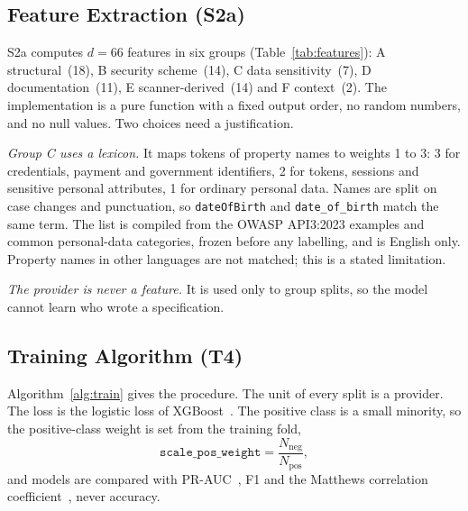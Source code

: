 \documentclass[conference]{IEEEtran}
\begin{document}
\subsection{Feature Extraction (S2a)}
\label{sec:m-feat}
S2a computes $d=66$ features in six groups (Table~\ref{tab:features}): A structural~(18),
B security scheme~(14), C data sensitivity~(7), D documentation~(11), E scanner-derived~(14)
and F context~(2). The implementation is a pure function with a fixed output order, no random
numbers, and no null values. Two choices need a justification.

\emph{Group C uses a lexicon.} It maps tokens of property names to weights 1 to 3: 3 for
credentials, payment and government identifiers, 2 for tokens, sessions and sensitive personal
attributes, 1 for ordinary personal data. Names are split on case changes and punctuation, so
\texttt{dateOfBirth} and \texttt{date\_of\_birth} match the same term. The list is compiled
from the OWASP API3:2023 examples and common personal-data categories, frozen before any
labelling, and is English only. Property names in other languages are not matched; this is a
stated limitation.

\emph{The provider is never a feature.} It is used only to group splits, so the model cannot
learn who wrote a specification.

\subsection{Training Algorithm (T4)}
Algorithm~\ref{alg:train} gives the procedure. The unit of every split is a provider. The
loss is the logistic loss of XGBoost~\cite{xgboost}. The positive class is a small minority,
so the positive-class weight is set from the training fold,
\begin{equation}
\texttt{scale\_pos\_weight}=\frac{N_{\text{neg}}}{N_{\text{pos}}},
\end{equation}
and models are compared with PR-AUC~\cite{saito}, F1 and the Matthews correlation
coefficient~\cite{chicco}, never accuracy.
\end{document}
